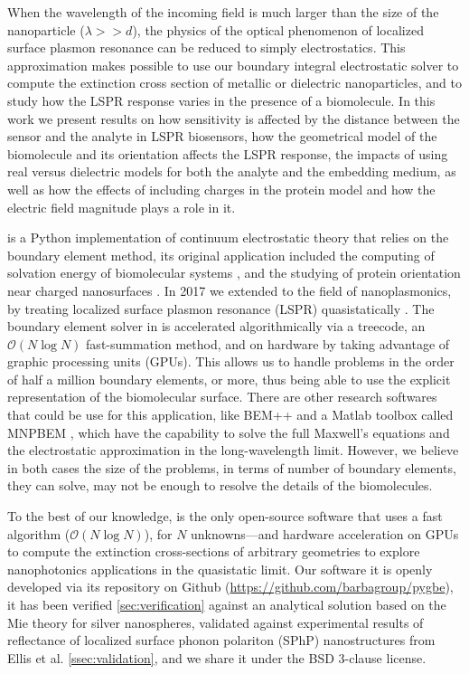 When the wavelength of the incoming field is much larger than the size of the nanoparticle ($\lambda>>d$), the physics of the optical phenomenon of 
localized surface plasmon resonance can be reduced to simply electrostatics. This approximation makes possible to use our boundary integral 
electrostatic solver \pygbe to compute the extinction cross section of metallic or dielectric nanoparticles, and to study how the LSPR response varies in the 
presence of a biomolecule. In this work we present results on how sensitivity is affected by the distance between the sensor and the analyte in LSPR biosensors, 
how the geometrical model of the biomolecule and its orientation affects the LSPR response, the impacts of using real versus dielectric models for both 
the analyte and the embedding medium, as well as how the effects of including charges in the protein model and how the electric field magnitude
plays a role in it.

\pygbe is a Python implementation of continuum electrostatic theory that relies on the boundary element method, its original application included 
the computing of solvation energy of biomolecular systems \cite{CooperBardhanBarba2013}, and the studying of protein orientation near charged 
nanosurfaces \cite{CooperClementiBarba2015}. In 2017 we extended \pygbe to the field of nanoplasmonics, by treating localized surface plasmon resonance 
(LSPR) quasistatically \cite{ClementiETal2017}. The boundary element solver in \pygbe is accelerated algorithmically via a treecode, an $\mathcal{O}(N\log N)$ 
fast-summation method, and on hardware by taking advantage of graphic processing units (GPUs). This allows us to handle problems in the order of half a million 
boundary elements, or more, thus being able to use the explicit representation of the biomolecular surface. There are other research softwares that could be use 
for this application, like BEM++ \cite{SmigajETal2015} and a Matlab toolbox called MNPBEM \cite{HohenesterTrugler2012}, which have the capability to solve the 
full Maxwell's equations and the electrostatic approximation in the long-wavelength limit. However, we believe in both cases the size of the problems, in terms of
number of boundary elements, they can solve, may not be enough to resolve the details of the biomolecules. 
 
To the best of our knowledge, \pygbe is the only open-source software that uses a fast algorithm ($\mathcal{O}(N\log N)$),
for $N$ unknowns—and hardware acceleration on GPUs to compute the extinction cross-sections of arbitrary geometries to explore
nanophotonics applications in the quasistatic limit. Our software it is openly developed via its repository on 
Github (\url{https://github.com/barbagroup/pygbe}), it has been verified \ref{sec:verification} against an analytical solution based 
on the Mie theory for silver nanospheres, validated against experimental results of reflectance of localized surface phonon polariton 
(SPhP) nanostructures from Ellis et al. \ref{ssec:validation}, and we share it under the BSD 3-clause license.

